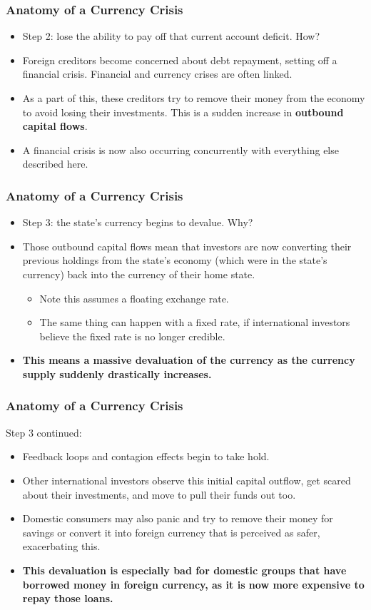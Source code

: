 \documentclass{beamer}
\begin{document}
\begin{frame} 
	\frametitle{\LARGE{Anatomy of a Currency Crisis}}
	\begin{itemize}
		\item Step 2: lose the ability to pay off that current account deficit. How? \pause
		\item Foreign creditors become concerned about debt repayment, setting off a financial crisis. Financial and currency crises are often linked. \pause
		\item As a part of this, these creditors try to remove their money from the economy to avoid losing their investments. This is a sudden increase in \textbf{outbound capital flows}. \pause
		\item A financial crisis is now also occurring concurrently with everything else described here.	
	\end{itemize}
\end{frame}

\begin{frame} 
	\frametitle{\LARGE{Anatomy of a Currency Crisis}}
	\begin{itemize}
		\item Step 3: the state's currency begins to devalue. Why?
		\item Those outbound capital flows mean that investors are now converting their previous holdings from the state's economy (which were in the state's currency) back into the currency of their home state.
		\begin{itemize}
			\item Note this assumes a floating exchange rate.
			\item The same thing can happen with a fixed rate, if international investors believe the fixed rate is no longer credible. \pause
		\end{itemize}
		\item \textbf{This means a massive devaluation of the currency as the currency supply suddenly drastically increases.}
	\end{itemize}
\end{frame}

\begin{frame} 
	\frametitle{\LARGE{Anatomy of a Currency Crisis}}
	Step 3 continued:
	\begin{itemize}
		\item Feedback loops and contagion effects begin to take hold.
		\item Other international investors observe this initial capital outflow, get scared about their investments, and move to pull their funds out too. \pause
		\item Domestic consumers may also panic and try to remove their money for savings or convert it into foreign currency that is perceived as safer, exacerbating this.
		\item \textbf{This devaluation is especially bad for domestic groups that have borrowed money in foreign currency, as it is now more expensive to repay those loans.}
	\end{itemize}
\end{frame}
\end{document}
